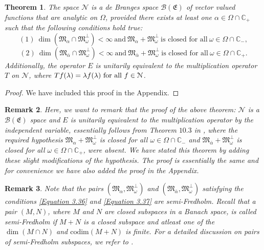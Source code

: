 \documentclass [12pt,reqno]{amsart}
\numberwithin{equation}{subsection}
\newtheorem{thm}{Theorem}[section]
\newtheorem{rmk}[thm]{Remark}
\numberwithin{equation}{section}
\begin{document}
\begin{thm}\label{Theorem 3.8} The space $\mathcal{N}$ is a de Branges space $\mathcal{B}(\mathfrak{E})$ of vector valued functions that are analytic on $\Omega$, provided there exists at least one \(\alpha \in  \Omega \cap \mathbb{C}_+\) such that the following conditions hold true:
\begin{equation} \label{Equation 3.36}
(1)~\dim(\mathfrak{M}_{\alpha} \cap \mathfrak{M}_{\omega}^{\perp}) < \infty~ \mbox{and}~ \mathfrak{M}_{\alpha} + \mathfrak{M}_{\omega}^{\perp} ~\mbox{is closed for all}~ \omega \in  \Omega \cap \mathbb{C}_-,
 \end{equation}
 \begin{equation} \label{Equation 3.37}
(2)~\dim(\mathfrak{M}_{\bar{\alpha}} \cap \mathfrak{M}_{\omega}^{\perp}) < \infty ~ \mbox{and}~ \mathfrak{M}_{\bar{\alpha}} + \mathfrak{M}_{\omega}^{\perp} ~\mbox{is closed for all}~ \omega \in \Omega \cap \mathbb{C}_+.
\end{equation}
Additionally, the operator \(E\) is unitarily equivalent to the multiplication operator \(T\) on \(\mathcal{N}\), where \(Tf(\lambda) = \lambda f(\lambda)$ for all $f \in \mathcal{N}\).
\end{thm}
\begin{proof}We have included this proof in the Appendix.
\end{proof}
\begin{rmk} Here, we want to remark that the proof of the above theorem: $\mathcal{N}$ is a $\mathcal{B}(\mathfrak{E})$ space and $E$ is unitarily equivalent to the multiplication operator by the independent variable, essentially follows from Theorem $10.3$ in \cite{mahapatra}, where the required hypothesis $\mathfrak{M}_{\alpha} + \mathfrak{M}_{\omega}^{\perp}$ is closed for all $ \omega \in  \Omega \cap \mathbb{C}_-$ and $\mathfrak{M}_{\bar{\alpha}} + \mathfrak{M}_{\omega}^{\perp} $ is closed for all $\omega \in \Omega \cap \mathbb{C}_+$, were absent. We have stated this theorem by adding these slight modifications of the hypothesis. The proof is essentially the same and for convenience we have also added the proof in the Appendix.
   \end{rmk}
\begin{rmk}Note that the pairs $(\mathfrak{M}_{\alpha} , \mathfrak{M}_{\omega}^{\perp})$ and $(\mathfrak{M}_{\bar{\alpha}} , \mathfrak{M}_{\omega}^{\perp})$ satisfying the conditions \eqref{Equation 3.36} and \eqref{Equation 3.37} are semi-Fredholm. Recall that a pair $(M,N)$, where $M$ and $N$ are closed subspaces in a Banach space, is called semi-Fredholm if $M+N$ is a closed subspace and atleast one of the $\dim(M \cap N)$ and $\mathrm{codim}(M+N)$ is finite. For a detailed discussion on pairs of semi-Fredholm subspaces, we refer to \cite[Chapter $4$, Section $4$]{kato}.
\end{rmk}
\end{document}
